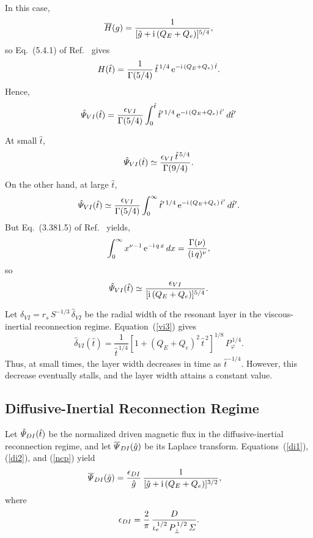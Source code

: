 \documentclass[12pt,prb,aps]{revtex4-1}
\begin{document}
In this case,
\begin{equation}
\overline{H}(g) = \frac{1}{[\hat{g}+{\rm i}\,(Q_E+Q_e)]^{5/4}},
\end{equation}
so Eq.~(5.4.1) of Ref.~ gives 
\begin{equation}
H(\hat{t}) = \frac{1}{\Gamma(5/4)}\,\hat{t}^{\,1/4}\,{\rm e}^{-{\rm i}\,(Q_E+Q_e)\,\hat{t}}.
\end{equation}
Hence,
\begin{equation}\label{vip}
\hat{\mit\Psi}_{VI}(\hat{t}) =\frac{\epsilon_{VI}}{\Gamma(5/4)}\int_0^{\hat{t}}
\hat{t}'^{\,1/4}\,{\rm e}^{-{\rm i}\,(Q_E+Q_e)\,\hat{t}'}\,d\hat{t}'
\end{equation}

At small $\hat{t}$,
\begin{equation}\label{vis}
\hat{\mit\Psi}_{VI}(\hat{t}) \simeq \frac{\epsilon_{VI}\,\hat{t}^{\,5/4}}{\Gamma(9/4)}.
\end{equation}
On the other hand, at large $\hat{t}$, 
\begin{equation}
\hat{\mit\Psi}_{VI}(\hat{t}) \simeq\frac{\epsilon_{VI}}{\Gamma(5/4)}\int_0^\infty
\hat{t}'^{\,1/4}\,{\rm e}^{-{\rm i}\,(Q_E+Q_e)\,\hat{t}'}\,d\hat{t}'.
\end{equation}
But Eq.~(3.381.5) of Ref.~ yields, 
\begin{equation}
\int_0^\infty x^{\nu-1}\,{\rm e}^{-{\rm i}\,q\,x}\,dx = \frac{\Gamma(\nu)}{({\rm i}\,q)^{\nu}},
\end{equation}
so 
\begin{equation}\label{vil}
\hat{\mit\Psi}_{VI}(\hat{t}) \simeq \frac{\epsilon_{VI}}{[{\rm i}\,(Q_E+Q_e)]^{5/4}}.
\end{equation}

Let $\delta_{VI} =r_s\,S^{-1/3}\,\hat{\delta}_{VI}$ be the radial width of the resonant layer in the viscous-inertial  reconnection regime. 
Equation~(\ref{vi3}) gives 
\begin{equation}
\hat{\delta}_{VI}(\hat{t}) = \frac{1}{\hat{t}^{\,1/4}}\left[1+(Q_E+Q_e)^2\,\hat{t}^{\,2}\right]^{1/8}\,P_\varphi^{\,1/4}.
\end{equation}
Thus, at small times, the layer width decreases in time as $\hat{t}^{-1/4}$. However, this decrease eventually stalls, and the
layer width attains a constant value. 

\subsection{Diffusive-Inertial Reconnection Regime}
Let $\hat{\mit\Psi}_{DI}(\hat{t})$ be the normalized driven magnetic flux in the diffusive-inertial reconnection regime, and let $\overline{\mit\Psi}_{DI}(\hat{g})$ be its Laplace transform.
Equations~(\ref{di1}), (\ref{di2}), and (\ref{ncp}) yield
\begin{align}
\overline{\mit\Psi}_{DI}(\hat{g}) &=\frac{\epsilon_{DI}}{\hat{g}}\,\frac{1}{[\hat{g}+{\rm i}\,(Q_E+Q_e)]^{3/2}},
\end{align}
where
\begin{equation}
\epsilon_{DI} = \frac{2}{\pi}\,\frac{D}{\iota_e^{\,1/2}\,P_\perp^{\,1/2}\,{\mit\Sigma}}.
\end{equation}
\end{document}

